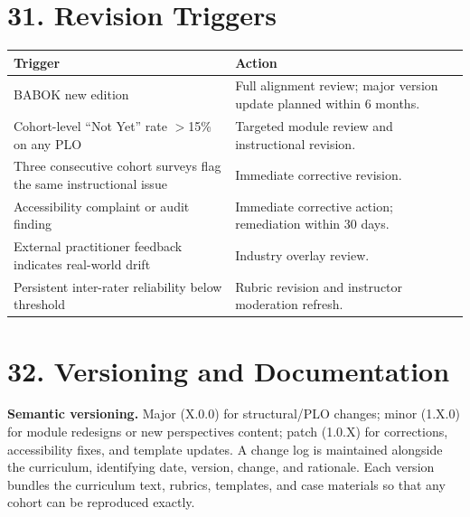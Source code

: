 \documentclass[11pt,letterpaper,oneside]{report}
\begin{document}
\section*{31. Revision Triggers}

\begin{tcolorbox}[callout,colback=afpaper,colframe=afnavy,colbacktitle=afnavy,title=Revision Trigger Catalogue]
\begin{tabularx}{\linewidth}{@{}R{6.4cm} >{\RaggedRight\arraybackslash}X@{}}
\toprule
\sffamily\bfseries Trigger & \sffamily\bfseries Action \\
\midrule
BABOK new edition                                                                & Full alignment review; major version update planned within 6 months. \\
Cohort-level ``Not Yet'' rate $>$15\% on any PLO                                  & Targeted module review and instructional revision. \\
Three consecutive cohort surveys flag the same instructional issue               & Immediate corrective revision. \\
Accessibility complaint or audit finding                                         & Immediate corrective action; remediation within 30 days. \\
External practitioner feedback indicates real-world drift                        & Industry overlay review. \\
Persistent inter-rater reliability below threshold                               & Rubric revision and instructor moderation refresh. \\
\bottomrule
\end{tabularx}
\end{tcolorbox}

\section*{32. Versioning and Documentation}
\textbf{Semantic versioning.} Major (X.0.0) for structural/PLO changes; minor (1.X.0) for module redesigns or new perspectives content; patch (1.0.X) for corrections, accessibility fixes, and template updates. A change log is maintained alongside the curriculum, identifying date, version, change, and rationale. Each version bundles the curriculum text, rubrics, templates, and case materials so that any cohort can be reproduced exactly.
\end{document}

